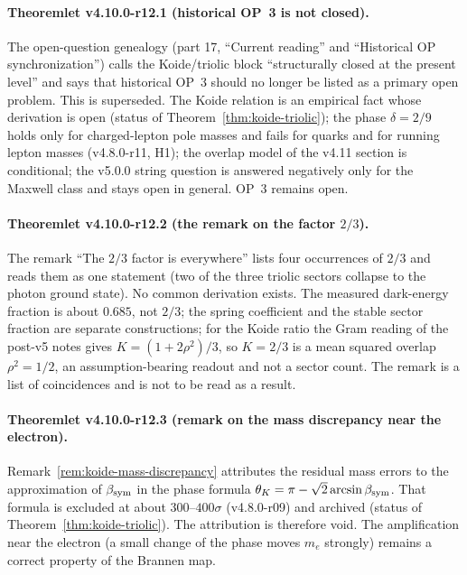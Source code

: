 \paragraph{Theoremlet v4.10.0-r12.1 (historical OP~3 is not closed).}
The open-question genealogy (part 17, ``Current reading'' and ``Historical OP synchronization'') calls the Koide/triolic block
``structurally closed at the present level'' and says that historical OP~3 should no longer be listed as a primary open problem.
This is superseded.  The Koide relation is an empirical fact whose derivation is open (status of
Theorem~\ref{thm:koide-triolic}); the phase \(\delta=2/9\) holds only for charged-lepton pole masses and fails for quarks and
for running lepton masses (v4.8.0-r11, H1); the overlap model of the v4.11 section is conditional; the v5.0.0 string question
is answered negatively only for the Maxwell class and stays open in general.  OP~3 remains open.

\paragraph{Theoremlet v4.10.0-r12.2 (the remark on the factor \(2/3\)).}
The remark ``The \(2/3\) factor is everywhere'' lists four occurrences of \(2/3\) and reads them as one statement (two of the
three triolic sectors collapse to the photon ground state).  No common derivation exists.  The measured dark-energy fraction
is about \(0.685\), not \(2/3\); the spring coefficient and the stable sector fraction are separate constructions; for the Koide
ratio the Gram reading of the post-v5 notes gives \(K=(1+2\rho^2)/3\), so \(K=2/3\) is a mean squared overlap
\(\rho^2=1/2\), an assumption-bearing readout and not a sector count.  The remark is a list of coincidences and is not to be
read as a result.

\paragraph{Theoremlet v4.10.0-r12.3 (remark on the mass discrepancy near the electron).}
Remark~\ref{rem:koide-mass-discrepancy} attributes the residual mass errors to the approximation of \(\beta_{\rm sym}\) in the
phase formula \(\theta_K=\pi-\sqrt2\arcsin\beta_{\rm sym}\).  That formula is excluded at about \(300\)--\(400\sigma\)
(v4.8.0-r09) and archived (status of Theorem~\ref{thm:koide-triolic}).  The attribution is therefore void.  The amplification
near the electron (a small change of the phase moves \(m_e\) strongly) remains a correct property of the Brannen map.

